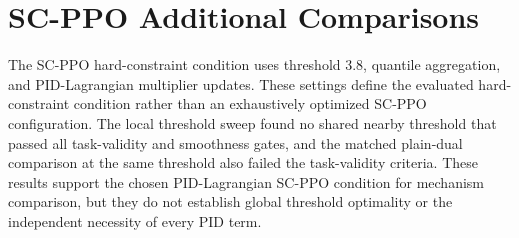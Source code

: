 \documentclass[10pt]{article}
\begin{document}
\section{SC-PPO Additional Comparisons}

The SC-PPO hard-constraint condition uses threshold 3.8, quantile aggregation, and
PID-Lagrangian multiplier updates. These settings define the evaluated
hard-constraint condition rather than an exhaustively optimized SC-PPO
configuration. The local threshold sweep found no shared nearby threshold that
passed all task-validity and smoothness gates, and the matched plain-dual
comparison at the same threshold also failed the task-validity criteria. These
results support the chosen PID-Lagrangian SC-PPO condition for mechanism
comparison, but they do not establish global threshold optimality or the
independent necessity of every PID term.
\end{document}
